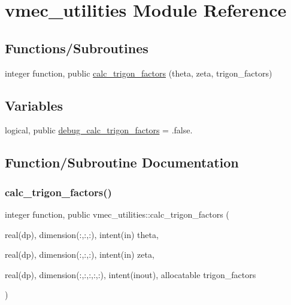 \hypertarget{namespacevmec__utilities}{}\section{vmec\+\_\+utilities Module Reference}
\label{namespacevmec__utilities}
\subsection*{Functions/\+Subroutines}
\begin{DoxyCompactItemize}
\item 
integer function, public \hyperlink{namespacevmec__utilities_ac699116fc25fdea3e28e488513d97c87}{calc\+\_\+trigon\+\_\+factors} (theta, zeta, trigon\+\_\+factors)
\end{DoxyCompactItemize}
\subsection*{Variables}
\begin{DoxyCompactItemize}
\item 
logical, public \hyperlink{namespacevmec__utilities_abeb2bf5595170bdf2dd07a6f2bfa89ff}{debug\+\_\+calc\+\_\+trigon\+\_\+factors} = .false.
\end{DoxyCompactItemize}


\subsection{Function/\+Subroutine Documentation}
\mbox{\label{namespacevmec__utilities_ac699116fc25fdea3e28e488513d97c87}} 
\subsubsection{\texorpdfstring{calc\+\_\+trigon\+\_\+factors()}{calc\_trigon\_factors()}}
{\footnotesize\ttfamily integer function, public vmec\+\_\+utilities\+::calc\+\_\+trigon\+\_\+factors (\begin{DoxyParamCaption}\item[{real(dp), dimension(\+:,\+:,\+:), intent(in)}]{theta,  }\item[{real(dp), dimension(\+:,\+:,\+:), intent(in)}]{zeta,  }\item[{real(dp), dimension(\+:,\+:,\+:,\+:,\+:), intent(inout), allocatable}]{trigon\+\_\+factors }\end{DoxyParamCaption})}



